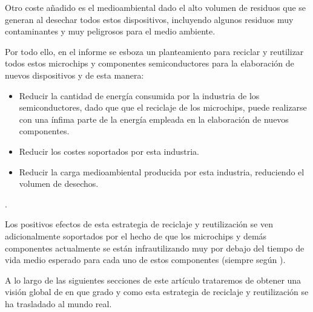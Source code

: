 Otro coste añadido es el medioambiental dado el alto volumen de residuos que se generan al desechar todos estos dispositivos, incluyendo algunos residuos muy contaminantes y muy peligrosos para el medio ambiente.

Por todo ello, en el informe \cite{reusing-silicon} se esboza un planteamiento para reciclar y reutilizar todos estos microchips y componentes semiconductores para la elaboración de nuevos dispositivos y de esta manera:

\begin{itemize}

\item{Reducir la cantidad de energía consumida por la industria de los semiconductores, dado que que el reciclaje de los microchips, puede realizarse con una ínfima parte de la energía empleada en la elaboración de nuevos componentes.}

\item{Reducir los costes soportados por esta industria.}

\item{Reducir la carga medioambiental producida por esta industria, reduciendo el volumen de desechos.}

\end{itemize}.

Los positivos efectos de esta estrategia de reciclaje y reutilización se ven adicionalmente soportados por el hecho de que los microchips y demás componentes actualmente se están infrautilizando muy por debajo del tiempo de vida medio esperado para cada uno de estos componentes (siempre según \cite{reusing-silicon}).

A lo largo de las siguientes secciones de este artículo trataremos de obtener una visión global de en que grado y como esta estrategia de reciclaje y reutilización se ha trasladado al mundo real.